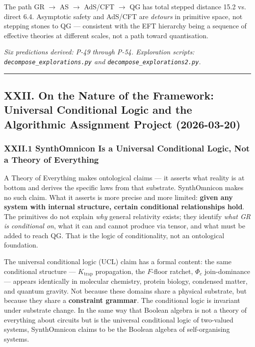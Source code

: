 \documentclass[12pt,a4paper]{article}
\begin{document}
The path GR $\rightarrow$ AS $\rightarrow$ AdS/CFT $\rightarrow$ QG has total stepped distance 15.2 vs. direct 6.4. Asymptotic safety and AdS/CFT are \emph{detours} in primitive space, not stepping stones to QG --- consistent with the EFT hierarchy being a sequence of effective theories at different scales, not a path toward quantisation.

\emph{Six predictions derived: P-49 through P-54. Exploration scripts: \texttt{decompose\_explorations.py} and \texttt{decompose\_explorations2.py}.}

\begin{center}
\rule{0.5\textwidth}{0.4pt}
\end{center}

\subsection{XXII. On the Nature of the Framework: Universal Conditional Logic and the Algorithmic Assignment Project (2026-03-20)}

\subsubsection{XXII.1 SynthOmnicon Is a Universal Conditional Logic, Not a Theory of Everything}

A Theory of Everything makes ontological claims --- it asserts what reality is at bottom and derives the specific laws from that substrate. SynthOmnicon makes no such claim. What it asserts is more precise and more limited: \textbf{given any system with internal structure, certain conditional relationships hold}. The primitives do not explain \emph{why} general relativity exists; they identify \emph{what GR is conditional on}, what it can and cannot produce via tensor, and what must be added to reach QG. That is the logic of conditionality, not an ontological foundation.

The universal conditional logic (UCL) claim has a formal content: the same conditional structure --- $K_\text{trap}$ propagation, the $F$-floor ratchet, $\Phi_c$ join-dominance --- appears identically in molecular chemistry, protein biology, condensed matter, and quantum gravity. Not because these domains share a physical substrate, but because they share a \textbf{constraint grammar}. The conditional logic is invariant under substrate change. In the same way that Boolean algebra is not a theory of everything about circuits but is the universal conditional logic of two-valued systems, SynthOmnicon claims to be the Boolean algebra of self-organising systems.
\end{document}
